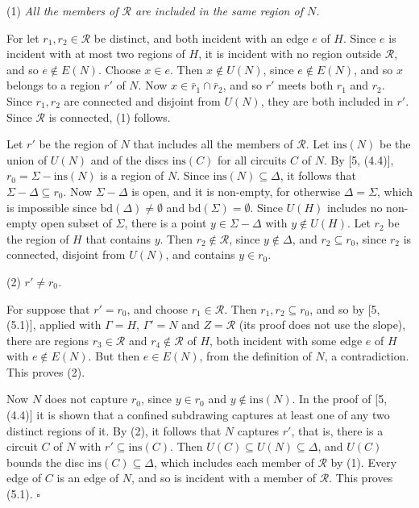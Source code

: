 {\hspace*{12pt}(1) \textit{All the members of $\mathscr{R}$ are included in the same region of $N$.}

For let $r_1, r_2 \in \mathscr{R}$ be distinct, and both incident with an edge $e$ of $H$. Since $e$ is incident with at most two regions of $H$, it is incident with no region outside $\mathscr{R}$, and so $e \notin E(N)$. Choose $x \in e$. Then $x \notin U(N)$, since $e \notin E(N)$, and so $x$ belongs to a region $r'$ of $N$. Now $x \in \bar{r}_1 \cap \bar{r}_2$, and so $r'$ meets both $r_1$ and $r_2$. Since $r_1, r_2$ are connected and disjoint from $U(N)$, they are both included in $r'$. Since $\mathscr{R}$ is connected, (1) follows.

Let $r'$ be the region of $N$ that includes all the members of $\mathscr{R}$. Let $\text{ins}(N)$ be the union of $U(N)$ and of the discs $\text{ins}(C)$ for all circuits $C$ of $N$. By [5, (4.4)], $r_0 = \Sigma - \text{ins}(N)$ is a region of $N$. Since $\text{ins}(N) \subseteq \Delta$, it follows that $\Sigma - \Delta \subseteq r_0$. Now $\Sigma - \Delta$ is open, and it is non-empty, for otherwise $\Delta = \Sigma$, which is impossible since $\text{bd}(\Delta) \ne \emptyset$ and $\text{bd}(\Sigma) = \emptyset$. Since $U(H)$ includes no non-empty open subset of $\Sigma$, there is a point $y \in \Sigma - \Delta$ with $y \notin U(H)$. Let $r_2$ be the region of $H$ that contains $y$. Then $r_2 \notin \mathscr{R}$, since $y \notin \Delta$, and $r_2 \subseteq r_0$, since $r_2$ is connected, disjoint from $U(N)$, and contains $y \in r_0$.

\hspace*{12pt}(2) \textit{$r' \ne r_0$.}

For suppose that $r' = r_0$, and choose $r_1 \in \mathscr{R}$. Then $r_1, r_2 \subseteq r_0$, and so by [5, (5.1)], applied with $\Gamma = H$, $\Gamma' = N$ and $Z = \mathscr{R}$ (its proof does not use the slope), there are regions $r_3 \in \mathscr{R}$ and $r_4 \notin \mathscr{R}$ of $H$, both incident with some edge $e$ of $H$ with $e \notin E(N)$. But then $e \in E(N)$, from the definition of $N$, a contradiction. This proves (2).

Now $N$ does not capture $r_0$, since $y \in r_0$ and $y \notin \text{ins}(N)$. In the proof of [5, (4.4)] it is shown that a confined subdrawing captures at least one of any two distinct regions of it. By (2), it follows that $N$ captures $r'$, that is, there is a circuit $C$ of $N$ with $r' \subseteq \text{ins}(C)$. Then $U(C) \subseteq U(N) \subseteq \Delta$, and $U(C)$ bounds the disc $\text{ins}(C) \subseteq \Delta$, which includes each member of $\mathscr{R}$ by (1). Every edge of $C$ is an edge of $N$, and so is incident with a member of $\mathscr{R}$. This proves (5.1). $\square$}

